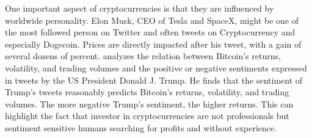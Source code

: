 \documentclass{article}
\begin{document}
	One important aspect of cryptocurrencies is that they are influenced by worldwide personality. Elon Musk, CEO of Tesla and SpaceX, might be one of the most followed person on Twitter and often tweets on Cryptocurrency and especially Dogecoin. Prices are directly impacted after his tweet, with a gain of several dozens of percent. \cite{dbrtt} analyzes the relation between Bitcoin's returns, volatility, and trading volumes and the positive or negative sentiments expressed in tweets by the US President Donald J. Trump. He finds that the sentiment of Trump’s tweets reasonably predicts Bitcoin’s returns, volatility, and trading volumes. The more negative Trump’s sentiment, the higher returns. This can highlight the fact that investor in cryptocurrencies are not professionals but sentiment sensitive humans searching for profits and without experience. \\
	
\end{document}
